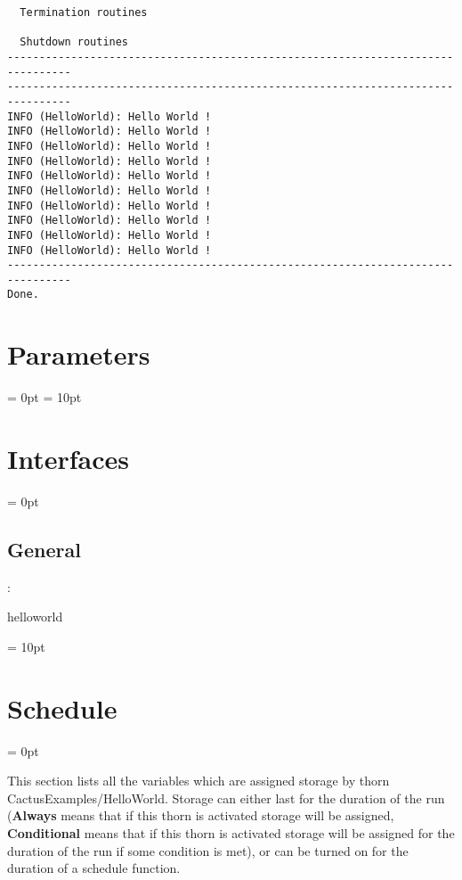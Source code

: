 \documentclass{article}
\begin{document}
{\begin{verbatim}
  Termination routines

  Shutdown routines
--------------------------------------------------------------------------------
--------------------------------------------------------------------------------
INFO (HelloWorld): Hello World !
INFO (HelloWorld): Hello World !
INFO (HelloWorld): Hello World !
INFO (HelloWorld): Hello World !
INFO (HelloWorld): Hello World !
INFO (HelloWorld): Hello World !
INFO (HelloWorld): Hello World !
INFO (HelloWorld): Hello World !
INFO (HelloWorld): Hello World !
INFO (HelloWorld): Hello World !
--------------------------------------------------------------------------------
Done.
\end{verbatim}
}




\section{Parameters} 


\parskip = 0pt
\parskip = 10pt 

\section{Interfaces} 


\parskip = 0pt

\vspace{3mm} \subsection*{General}

: 

helloworld
\vspace{2mm}

\vspace{5mm}\parskip = 10pt 

\section{Schedule} 


\parskip = 0pt


\noindent This section lists all the variables which are assigned storage by thorn CactusExamples/HelloWorld.  Storage can either last for the duration of the run ({\bf Always} means that if this thorn is activated storage will be assigned, {\bf Conditional} means that if this thorn is activated storage will be assigned for the duration of the run if some condition is met), or can be turned on for the duration of a schedule function.
\end{document}
